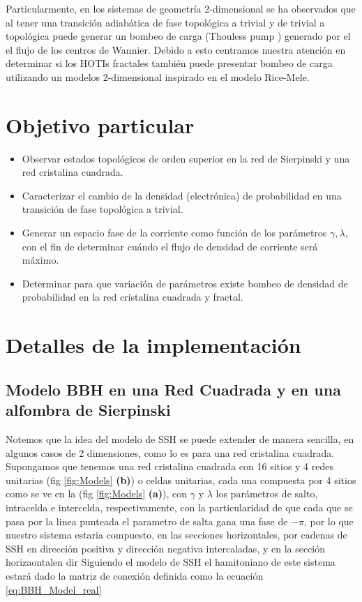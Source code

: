 Particularmente, en los sistemas de geometría 2-dimensional se ha observados que al tener una transición adiabática de fase topológica a trivial y de trivial a topológica puede generar un bombeo de carga (Thouless pump \cite{benalcazar2020higher}) generado por el el flujo de los centros de Wannier. Debido a esto centramos nuestra atención en determinar si los HOTIs fractales también puede presentar bombeo de carga utilizando un modelos 2-dimensional inspirado en el modelo Rice-Mele.
    
    \section{Objetivo particular}
    \begin{itemize}
        \item Observar estados topológicos de orden superior en la red de Sierpinski y una red cristalina cuadrada.
        \item Caracterizar el cambio de la densidad (electrónica) de probabilidad en una transición de fase topológica a trivial. 
        \item Generar un espacio fase de la corriente como función de los parámetros $\gamma, \lambda$, con el fin de determinar cuándo el flujo de densidad de corriente será máximo.
        \item Determinar para que variación de parámetros existe bombeo de densidad de probabilidad en la red cristalina cuadrada y fractal.
    \end{itemize}
    
\section{Detalles de la implementación}
    

\subsection{Modelo BBH en una Red Cuadrada y en una alfombra de Sierpinski}\label{sec:Modelo_BBH_square_and_Fractal}

    Notemos que la idea del modelo de SSH se puede extender de manera sencilla, en algunos casos de 2 dimensiones, como lo es para una red cristalina cuadrada. Supongamos que tenemos una red cristalina cuadrada con 16 sitios y 4 redes unitarias (fig \ref{fig:Models} \textbf{(b)}) o celdas unitarias, cada una compuesta por 4 sitios como se ve en la (fig \ref{fig:Models} \textbf{(a)}), con $\gamma$ y $\lambda$ los parámetros de salto, intracelda e intercelda, respectivamente, con la particularidad de que cada que se pasa por la linea punteada el parametro de salta gana una fase de $-\pi$, por lo que nuestro sistema estaria compuesto, en las secciones horizontales, por cadenas de SSH en dirección positiva y dirección negativa intercaladas, y en la sección horizaontalen dir Siguiendo el modelo de SSH el hamitoniano de este sistema estará dado la matriz de conexión definida como la ecuación \ref{eq:BBH_Model_real} 
    
